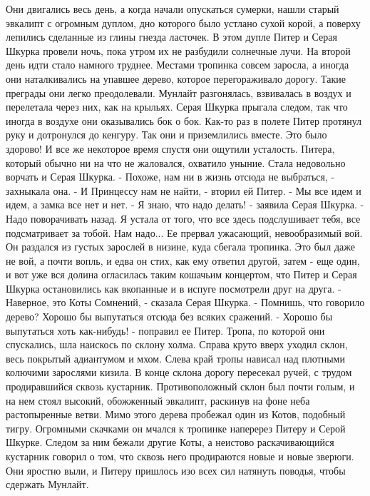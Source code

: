     Они двигались весь день, а когда начали опускаться сумерки, нашли 
старый эвкалипт с огромным дуплом, дно которого было устлано сухой 
корой, а поверху лепились сделанные из глины гнезда ласточек. В этом 
дупле Питер и Серая Шкурка провели ночь, пока утром их не разбудили 
солнечные лучи.
    На второй день идти стало намного труднее. Местами тропинка совсем 
заросла, а иногда они наталкивались на упавшее дерево, которое 
перегораживало дорогу. Такие преграды они легко преодолевали. Мунлайт 
разгонялась, взвивалась в воздух и перелетала через них, как на 
крыльях. Серая Шкурка прыгала следом, так что иногда в воздухе они 
оказывались бок о бок. Как-то раз в полете Питер протянул руку и 
дотронулся до кенгуру. Так они и приземлились вместе. Это было 
здорово!
    И все же некоторое время спустя они ощутили усталость. Питера, 
который обычно ни на что не жаловался, охватило уныние. Стала 
недовольно ворчать и Серая Шкурка.
    - Похоже, нам ни в жизнь отсюда не выбраться, - захныкала она.
    - И Принцессу нам не найти, - вторил ей Питер. - Мы все идем и 
идем, а замка все нет и нет.
    - Я знаю, что надо делать! - заявила Серая Шкурка. - Надо 
поворачивать назад. Я устала от того, что все здесь подслушивает тебя, 
все подсматривает за тобой. Нам надо...
    Ее прервал ужасающий, невообразимый вой. Он раздался из густых 
зарослей в низине, куда сбегала тропинка. Это был даже не вой, а почти 
вопль, и едва он стих, как ему ответил другой, затем - еще один, и вот 
уже вся долина огласилась таким кошачьим концертом, что Питер и Серая 
Шкурка остановились как вкопанные и в испуге посмотрели друг на друга.
    - Наверное, это Коты Сомнений, - сказала Серая Шкурка. - Помнишь, 
что говорило дерево? Хорошо бы выпутаться отсюда без всяких сражений.
    - Хорошо бы выпутаться хоть как-нибудь! - поправил ее Питер.
    Тропа, по которой они спускались, шла наискось по склону холма. 
Справа круто вверх уходил склон, весь покрытый адиантумом и мхом. 
Слева край тропы нависал над плотными колючими зарослями кизила. В 
конце склона дорогу пересекал ручей, с трудом продиравшийся сквозь 
кустарник. Противоположный склон был почти голым, и на нем стоял 
высокий, обожженный эвкалипт, раскинув на фоне неба растопыренные 
ветви.
    Мимо этого дерева пробежал один из Котов, подобный тигру. 
Огромными скачками он мчался к тропинке наперерез Питеру и Серой 
Шкурке. Следом за ним бежали другие Коты, а неистово раскачивающийся 
кустарник говорил о том, что сквозь него продираются новые и новые 
зверюги. Они яростно выли, и Питеру пришлось изо всех сил натянуть 
поводья, чтобы сдержать Мунлайт.
